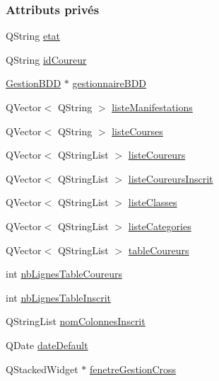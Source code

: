 \subsubsection*{Attributs privés}
\begin{DoxyCompactItemize}
\item 
Q\+String \hyperlink{class_i_h_m_gestion_cross_a5da4390d71dbd5d05cff339f93c7c85a}{etat}
\item 
Q\+String \hyperlink{class_i_h_m_gestion_cross_a9352a649126c14e7d0da3694c10c3cef}{id\+Coureur}
\item 
\hyperlink{class_gestion_b_d_d}{Gestion\+B\+DD} $\ast$ \hyperlink{class_i_h_m_gestion_cross_a440bac63a3e51db3e2c08e883f8cafc9}{gestionnaire\+B\+DD}
\item 
Q\+Vector$<$ Q\+String $>$ \hyperlink{class_i_h_m_gestion_cross_ac42ca910fa9802b3f63e3393aaa14e8a}{liste\+Manifestations}
\item 
Q\+Vector$<$ Q\+String $>$ \hyperlink{class_i_h_m_gestion_cross_a66fc14c0ed874e72b6ada34e9b83603a}{liste\+Courses}
\item 
Q\+Vector$<$ Q\+String\+List $>$ \hyperlink{class_i_h_m_gestion_cross_a8b2673ec9996d010d3d45f72770ddd87}{liste\+Coureurs}
\item 
Q\+Vector$<$ Q\+String\+List $>$ \hyperlink{class_i_h_m_gestion_cross_a6b7c699caf9ae80c89f4cf5c58ae93d6}{liste\+Coureurs\+Inscrit}
\item 
Q\+Vector$<$ Q\+String\+List $>$ \hyperlink{class_i_h_m_gestion_cross_ab1d62909817e9828796a8c28da193c38}{liste\+Classes}
\item 
Q\+Vector$<$ Q\+String\+List $>$ \hyperlink{class_i_h_m_gestion_cross_a3b5749783a83acaeb513e4170c97bb0e}{liste\+Categories}
\item 
Q\+Vector$<$ Q\+String\+List $>$ \hyperlink{class_i_h_m_gestion_cross_a9bf93b48403da7bf152f013055152630}{table\+Coureurs}
\item 
int \hyperlink{class_i_h_m_gestion_cross_a0f4f5886077b1c5cbfa9cc0680d0380f}{nb\+Lignes\+Table\+Coureurs}
\item 
int \hyperlink{class_i_h_m_gestion_cross_ad33a263cb137ae991a9be57dacc6760a}{nb\+Lignes\+Table\+Inscrit}
\item 
Q\+String\+List \hyperlink{class_i_h_m_gestion_cross_a94c58ce12155f117e0515ce0fc6503bc}{nom\+Colonnes\+Inscrit}
\item 
Q\+Date \hyperlink{class_i_h_m_gestion_cross_a021706ef369d2bf3b95bcb4a8ecfdbe4}{date\+Default}
\item 
Q\+Stacked\+Widget $\ast$ \hyperlink{class_i_h_m_gestion_cross_a2ae4807c25f35813507ff0a2abb2ffb3}{fenetre\+Gestion\+Cross}

\end{DoxyCompactItemize}
